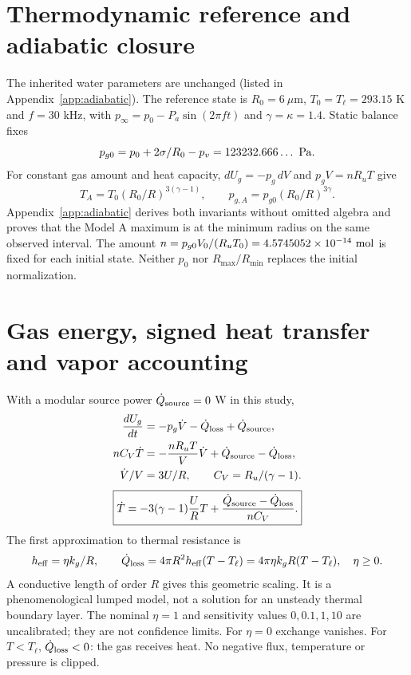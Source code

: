 \documentclass[10pt,a4paper]{article}
\begin{document}
\newpage
\section{Thermodynamic reference and adiabatic closure}
The inherited water parameters are unchanged (listed in Appendix~\ref{app:adiabatic}).
The reference state is $R_0=6\ \mu$m, $T_0=T_\ell=293.15$ K and $f=30$ kHz,
with $p_\infty=p_0-P_a\sin(2\pi ft)$ and $\gamma=\kappa=1.4$. Static balance fixes
\[
p_{g0}=p_0+2\sigma/R_0-p_v=123232.666\ldots\ {\rm Pa}.
\]
For constant gas amount and heat capacity, $dU_g=-p_g\,dV$ and $p_gV=nR_uT$ give
\begin{equation}\label{eq:adiabatic}
\boxed{T_A=T_0(R_0/R)^{3(\gamma-1)}},\qquad
\boxed{p_{g,A}=p_{g0}(R_0/R)^{3\gamma}}.
\end{equation}
Appendix~\ref{app:adiabatic} derives both invariants without omitted algebra and proves
that the Model A maximum is at the minimum radius on the same observed interval.
The amount $n=p_{g0}V_0/(R_uT_0)=4.5745052\times10^{-14}\ {\rm mol}$ is fixed for each initial state.
Neither $p_0$ nor $R_{\max}/R_{\min}$ replaces the initial normalization.

\section{Gas energy, signed heat transfer and vapor accounting}
With a modular source power $\dot Q_{\rm source}=0$ W in this study,
\begin{align}
\frac{dU_g}{dt}&=-p_g\dot V-\dot Q_{\rm loss}+\dot Q_{\rm source},\\
nC_V\dot T&=-\frac{nR_uT}{V}\dot V+\dot Q_{\rm source}-\dot Q_{\rm loss},\\
\dot V/V&=3U/R,\qquad C_V=R_u/(\gamma-1).
\end{align}
\begin{equation}\label{eq:energy}
\boxed{\dot T=-3(\gamma-1)\frac{U}{R}T+
\frac{\dot Q_{\rm source}-\dot Q_{\rm loss}}{nC_V}.}
\end{equation}
The first approximation to thermal resistance is
\begin{equation}\label{eq:heat}
h_{\rm eff}=\eta k_g/R,\qquad
\dot Q_{\rm loss}=4\pi R^2h_{\rm eff}(T-T_\ell)=4\pi\eta k_gR(T-T_\ell),\quad\eta\ge0.
\end{equation}
A conductive length of order $R$ gives this geometric scaling. It is a phenomenological lumped model, not a solution for an unsteady thermal boundary layer. The nominal $\eta=1$ and sensitivity values $0,0.1,1,10$ are uncalibrated; they are not confidence limits. For $\eta=0$ exchange vanishes. For $T<T_\ell$, $\dot Q_{\rm loss}<0$: the gas receives heat. No negative flux, temperature or pressure is clipped.
\end{document}
